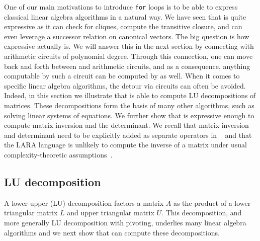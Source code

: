 One of our main motivations to introduce \texttt{for} loops is to be able
to express classical linear algebra algorithms in a natural way. We have seen that \langfor is
quite expressive as it can check for cliques, compute the transitive closure, and can even
leverage a successor relation on canonical vectors. The big question is how expressive \langfor
actually is. We will answer this in the next section by connecting \langfor with 
arithmetic circuits of polynomial degree. Through this connection, one can move back and forth between \langfor and arithmetic circuits, and as a consequence, anything computable by such a circuit can be
computed by \langfor as well. When it comes to specific linear algebra algorithms, the detour via circuits
can often be avoided. Indeed, in this section we illustrate that \langfor is able to
compute LU decompositions of matrices. These decompositions form the basis of many other algorithms, such as solving linear systems of equations. We further show that \langfor is expressive enough to compute matrix inversion and the determinant. We recall that matrix inversion and determinant need to be explicitly added as separate operators in \lang~\cite{matlang,matlang-journal} and that the LARA language is unlikely to compute the inverse of a matrix under usual complexity-theoretic assumptions~\cite{BarceloH0S20}.

\subsection{LU decomposition}
%
%
A lower-upper (LU) decomposition factors a matrix $A$ as the product of a lower triangular matrix $L$ and upper triangular matrix $U$.  This decomposition, and more generally LU decomposition with pivoting,  underlies many linear algebra algorithms and 
we next show that \langfor can compute these decompositions.

